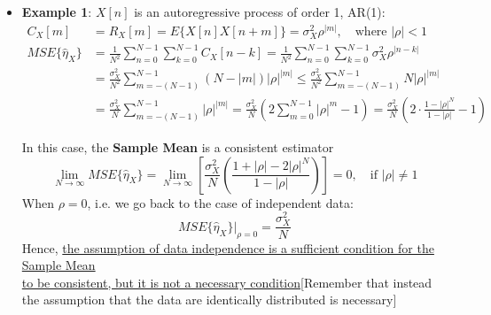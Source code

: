 \begin{itemize}
\item \textbf{Example 1}: \(X[n]\) is an autoregressive process of order 1, AR(1):
\[
\begin{aligned}
C_X[m] 
&= R_X[m] = E\{X[n]X[n+m]\} = \sigma_X^2 \rho^{|m|}, \quad \text{where } |\rho| < 1
\\[1ex]
MSE\{\hat{\eta}_X\} 
&= \frac{1}{N^2} \sum_{n=0}^{N-1} \sum_{k=0}^{N-1} C_X[n-k] = \frac{1}{N^2} \sum_{n=0}^{N-1} \sum_{k=0}^{N-1} \sigma_X^2 \rho^{|n-k|}\\[1ex]
&= \frac{\sigma_X^2}{N^2} \sum_{m=-(N-1)}^{N-1} (N-|m|) |\rho|^{|m|}
\leq \frac{\sigma_X^2}{N^2} \sum_{m=-(N-1)}^{N-1} N |\rho|^{|m|}
\\[1ex]
&= \frac{\sigma_X^2}{N} \sum_{m=-(N-1)}^{N-1} |\rho|^{|m|}
= \frac{\sigma_X^2}{N} \left(2\sum_{m=0}^{N-1} |\rho|^m - 1\right)
= \frac{\sigma_X^2}{N} \left(2 \cdot \frac{1-|\rho|^N}{1-|\rho|} - 1\right)
\end{aligned}
\]

\noindent In this case, the \textbf{Sample Mean} is a consistent estimator
\[
\lim_{N \to \infty} MSE\{\hat{\eta}_X\}
= \lim_{N \to \infty} \left[ \frac{\sigma_X^2}{N} \left( \frac{1+|\rho|-2|\rho|^N}{1-|\rho|} \right) \right]
= 0, \quad \text{if } |\rho|\neq 1
\]
\noindent When \(\rho=0\), i.e. we go back to the case of independent data:
\[
MSE\{\hat{\eta}_X\}\Big|_{\rho=0}=\frac{\sigma_X^2}{N}
\]
\noindent Hence, \underline{the assumption of data independence is a sufficient condition for the Sample Mean}\\
\noindent\underline{to be consistent, but it is not a necessary condition}[Remember that instead the assumption that the data are identically distributed is necessary]


\end{itemize}
